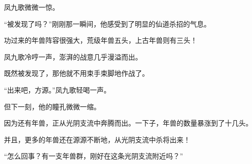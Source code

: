 \begin{this_body}
凤九歌微微一惊。

“被发现了吗？”刚刚那一瞬间，他感受到了明显的仙道杀招的气息。

功过来的年兽阵容很强大，荒级年兽五头，上古年兽则有三头！

凤九歌冷哼一声，澎湃的战意几乎漫溢而出。

既然被发现了，那他就不用束手束脚地作战了。

“出来吧，方源。”凤九歌轻喝一声。

但下一刻，他的瞳孔微微一缩。

因为还有年兽，正从光阴支流中奔腾而出。一下子，年兽的数量暴涨到了十几头。

并且，更多的年兽还在源源不断地，从光阴支流中杀将出来！

“怎么回事？有一支年兽群，刚好在这条光阴支流附近吗？”

\end{this_body}


